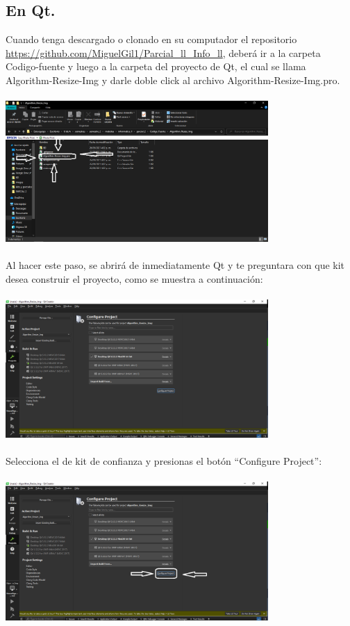 \documentclass{article}
\begin{document}
\subsection{En Qt.}
Cuando tenga descargado o clonado en su computador el repositorio \url{https://github.com/MiguelGil1/Parcial_ll_Info_ll}, deberá ir a la carpeta Codigo-fuente y luego a la carpeta del proyecto de Qt, el cual se llama Algorithm-Resize-Img y darle doble click al archivo Algorithm-Resize-Img.pro.
\\
\\
\includegraphics[width=10cm]{explorador_archivos.PNG}
\\
\\
Al hacer este paso, se abrirá de inmediatamente Qt y te preguntara con que kit desea construir el proyecto, como se muestra a continuación:
\\
\\
\includegraphics[width=10cm]{build.PNG}
\\
\\
Selecciona el de kit de confianza y presionas el botón “Configure Project”:
\\
\\
\includegraphics[width=10cm]{configurar_proyecto.PNG}
\end{document}
